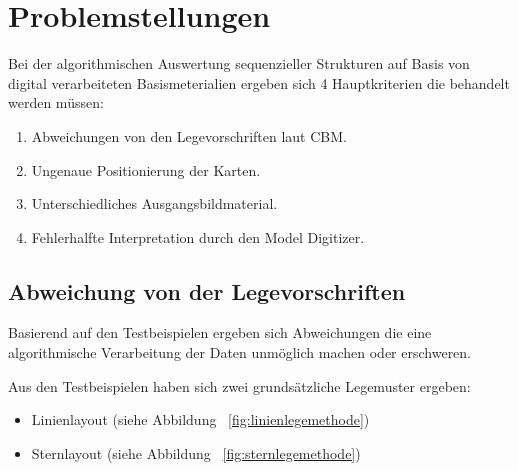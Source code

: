 \section{Problemstellungen} %
\label{sec:problemstellungen}
Bei der algorithmischen Auswertung sequenzieller Strukturen auf Basis von digital verarbeiteten Basismeterialien ergeben sich 4 Hauptkriterien die behandelt werden müssen:
\begin{enumerate}
	\item Abweichungen von den Legevorschriften laut CBM.
	\item Ungenaue Positionierung der Karten.
	\item Unterschiedliches Ausgangsbildmaterial.
	\item Fehlerhalfte Interpretation durch den Model Digitizer.
\end{enumerate}

\subsection{Abweichung von der Legevorschriften} %
\label{ssub:abweichung_von_der_legevorschriften}
Basierend auf den Testbeispielen ergeben sich Abweichungen die eine algorithmische Verarbeitung der Daten unmöglich machen oder erschweren.

Aus den Testbeispielen haben sich zwei grundsätzliche Legemuster ergeben:

\begin{itemize}
	\item Linienlayout (siehe Abbildung ~\ref{fig:linienlegemethode}) 
	\item Sternlayout (siehe Abbildung ~\ref{fig:sternlegemethode}) 
\end{itemize}

